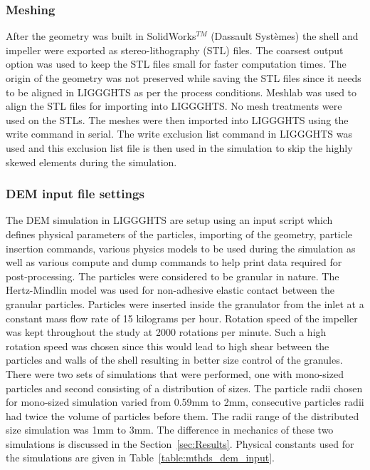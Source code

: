 \documentclass[preprint,11pt,authoryear]{elsarticle}
\begin{document}
\subsubsection{Meshing}
 After the geometry was built in SolidWorks$^{TM}$ (Dassault Syst\`{e}mes) the shell and impeller 
were exported as stereo-lithography (STL) files. The coarsest output option was used to keep the STL files 
small for faster computation times. The origin of the geometry was not preserved while saving 
the STL files since it needs to be aligned in LIGGGHTS as per the process conditions. 
Meshlab was used to align the STL files for importing into LIGGGHTS. No mesh treatments were 
used on the STLs. The meshes were then imported into LIGGGHTS using the write command in serial. 
The write exclusion list command in LIGGGHTS was used and this exclusion list file is then used in the 
simulation to skip the highly skewed elements during the simulation. 


\subsubsection{DEM input file settings}
The DEM simulation in LIGGGHTS are setup using an input script which defines physical 
parameters of the particles, importing of the geometry, particle insertion commands, various physics 
models to be used during the simulation as well as various compute and dump commands to help print 
data required for post-processing. The particles were considered to be granular in 
nature. The Hertz-Mindlin model was used for non-adhesive elastic contact between the granular particles. 
Particles were inserted inside the granulator from the inlet at a constant mass flow rate of 15 
kilograms per hour. Rotation speed of the impeller was kept throughout the study at 2000 rotations 
per minute. Such a high rotation speed was chosen since this would lead to high shear between the 
particles and walls of the shell resulting in better size control of the granules. There were two sets of 
simulations that were performed, one with mono-sized particles and second consisting of a distribution 
of sizes. The particle radii chosen for mono-sized simulation varied from 0.59mm to 2mm, consecutive 
particles radii had twice the volume of particles before them. The radii range of the distributed 
size simulation was 1mm to 3mm. The difference in mechanics of these two simulations is discussed 
in the Section~\ref{sec:Results}. Physical constants used for the simulations are given in 
Table~\ref{table:mthds_dem_input}.
\end{document}
